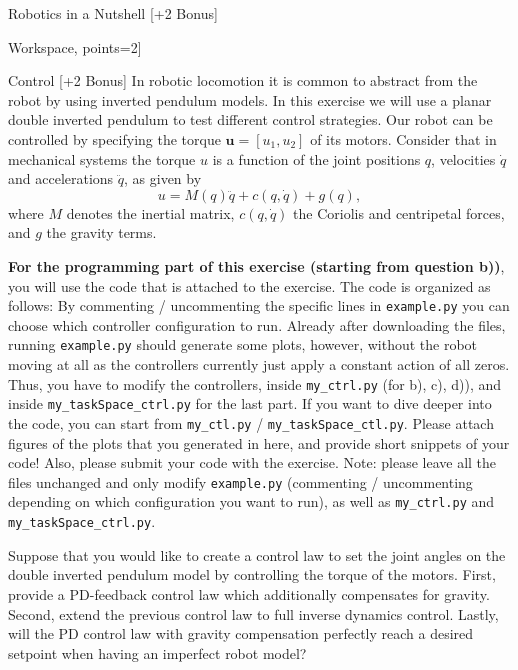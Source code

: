 \documentclass[
	ngerman,
	points=true,%
	]{tudaexercise}
\begin{document}
\begin{task}[points=12]{Robotics in a Nutshell [+2 Bonus]}
\begin{subtask}[title=[Bonus] Workspace, points=2]{}
        \todo  
         
    \end{subtask}{}
    

    
\end{task}


\begin{task}[points=30]{Control [+2 Bonus]} %
    In robotic locomotion it is common to abstract from the robot by using inverted pendulum models.
    In this exercise we will use a planar double inverted pendulum to test different control strategies. Our robot can be controlled by specifying the torque $\mathbf{u}=[u_1, u_2]$ of its motors. Consider that in mechanical systems the torque $u$ is a function of the joint positions $q$, velocities $\dot{q}$ and accelerations $\ddot{q}$, as given by  
    \[
        u=M(q)\ddot{q}+c(q,\dot{q})+g(q), 
    \] 
    where $M$ denotes the inertial matrix, $c(q,\dot{q})$ the Coriolis and centripetal forces, and $g$ the gravity terms.

    \textbf{For the programming part of this exercise (starting from question b))}, you will use the code that is attached to the exercise.
    The code is organized as follows: By commenting / uncommenting the specific lines in \texttt{example.py} you can choose which controller configuration to run. Already after downloading the files, running \texttt{example.py} should generate some plots, however, without the robot moving at all as the controllers currently just apply a constant action of all zeros. Thus, you have to modify the controllers, inside \texttt{my\_ctrl.py} (for b), c), d)), and inside \texttt{my\_taskSpace\_ctrl.py} for the last part. If you want to dive deeper into the code, you can start from \texttt{my\_ctl.py} / \texttt{my\_taskSpace\_ctl.py}.
    Please attach figures of the plots that you generated in here, and provide short snippets of your code! Also, please submit your code with the exercise. Note: please leave all the files unchanged and only modify \texttt{example.py} (commenting / uncommenting depending on which configuration you want to run), as well as \texttt{my\_ctrl.py} and \texttt{my\_taskSpace\_ctrl.py}.

    
    \begin{subtask}[title=Gravity Compensation and Inverse Dynamics Control, points=5]{}
        Suppose that you would like to create a control law to set the joint angles on the double inverted pendulum model by controlling the torque of the motors. First, provide a PD-feedback control law which additionally compensates for gravity. Second, extend the previous control law to full inverse dynamics control. Lastly, will the PD control law with gravity compensation perfectly reach a desired setpoint when having an imperfect
robot model? \\
        

\end{subtask}
\end{task}
\end{document}
